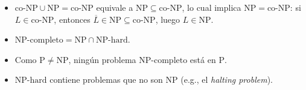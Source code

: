 \begin{enumerate}
  \begin{itemize}
    \item \(\text{co-NP} \cup \mathrm{NP} = \text{co-NP}\) equivale a \(\mathrm{NP} \subseteq \text{co-NP}\), lo cual implica \(\mathrm{NP} = \text{co-NP}\): si \(L \in \text{co-NP}\), entonces \(\overline{L} \in \mathrm{NP} \subseteq \text{co-NP}\), luego \(L \in \mathrm{NP}\).
    \item \(\mathrm{NP\text{-}completo} = \mathrm{NP} \cap \mathrm{NP\text{-}hard}\).
    \item Como \(\mathrm{P} \neq \mathrm{NP}\), ningún problema \(\mathrm{NP\text{-}completo}\) está en \(\mathrm{P}\).
    \item \(\mathrm{NP\text{-}hard}\) contiene problemas que no son \(\mathrm{NP}\) (e.g., el \textit{halting problem}).
  \end{itemize}
\end{enumerate}
